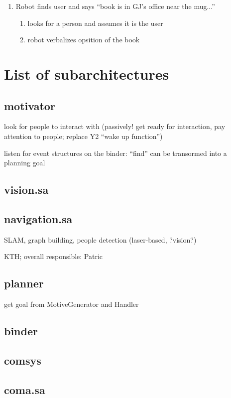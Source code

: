 \documentclass{article}
\begin{document}
\begin{enumerate}
\item Robot finds user and says ``book is in GJ's office near the mug...''
	\begin{enumerate}
	\item looks for a person and assumes it is the user
	\item robot verbalizes opsition of the book
	\end{enumerate}

\end{enumerate}

\section{List of subarchitectures}

\subsection{motivator}
look for people to interact with 
(passively! get ready for interaction, 
pay attention to people; replace Y2 ``wake up function'')

listen for event structures on the binder: ``find'' can be transormed
into a planning goal

\subsection{vision.sa}


\subsection{navigation.sa}
SLAM, graph building, people detection (laser-based, ?vision?)

KTH; overall responsible: Patric

\subsection{planner}
get goal from MotiveGenerator and Handler

\subsection{binder}

\subsection{comsys}

\subsection{coma.sa}
\end{document}
